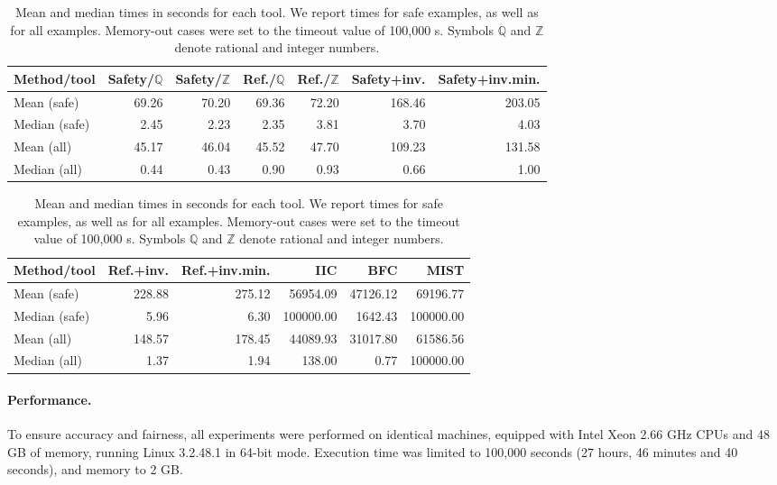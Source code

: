 \begin{table}[t]
  \centering
  \caption[Mean and median times in seconds for each tool.]
  {Mean and median times in seconds for each tool. We report
  times for safe examples, as well as for all examples. Memory-out cases were
  set to the timeout value of 100,000 s. Symbols
  $\mathbb{Q}$ and $\mathbb{Z}$ denote rational and integer numbers.}
\label{table:mean-median-times}
  \scriptsize
  \begin{tabular}{lrrrrrr}
    \toprule
    Method/tool & Safety/$\mathbb{Q}$ & Safety/$\mathbb{Z}$ & Ref./$\mathbb{Q}$ &
    Ref./$\mathbb{Z}$ & Safety+inv. & Safety+inv.min. \\
    \midrule
    Mean (safe)   & 69.26 & 70.20 & 69.36 & 72.20 & 168.46 & 203.05 \\
    Median (safe) & 2.45 & 2.23 & 2.35 & 3.81 & 3.70 & 4.03 \\
    \midrule
    Mean (all)    & 45.17 & 46.04 & 45.52 & 47.70 & 109.23 & 131.58 \\
    Median (all)  & 0.44 & 0.43 & 0.90 & 0.93 & 0.66 & 1.00 \\
    \bottomrule
  \end{tabular}
  
  \vspace{1ex}
  
  \begin{tabular}{lrrrrr}
    \toprule
    Method/tool &
    Ref.+inv. & Ref.+inv.min. & IIC & BFC & MIST \\
    \midrule
    Mean (safe)   & 228.88 & 275.12 & 56954.09 & 47126.12 & 69196.77 \\
    Median (safe) & 5.96 & 6.30 & 100000.00 & 1642.43 & 100000.00 \\
    \midrule
    Mean (all)    & 148.57 & 178.45 & 44089.93 & 31017.80 & 61586.56 \\
    Median (all)  & 1.37 & 1.94 & 138.00 & 0.77 & 100000.00 \\
    \bottomrule
  \end{tabular}
\end{table}

\paragraph{Performance.} To ensure accuracy and fairness, all experiments were
performed on identical machines, equipped with Intel Xeon 2.66 GHz CPUs and 48 GB of memory, running Linux 3.2.48.1
in 64-bit mode. Execution time was limited to 100,000 seconds (27
hours, 46 minutes and 40 seconds), and memory to 2 GB\@.

